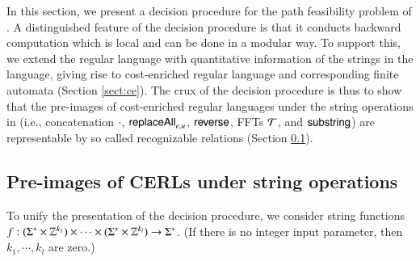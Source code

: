 

%

In this section, we present a decision procedure for the path feasibility problem of {\slint}. A distinguished feature of the decision procedure is that it conducts backward computation which is local and can be done in a modular way. To support this, we extend the regular language with quantitative information of the strings in the language, giving rise to cost-enriched regular language and corresponding finite automata (Section \ref{sect:ce}). The crux of the decision procedure is thus to %
show that the %
pre-images of cost-enriched regular languages under the string operations in {\slint} (i.e., concatenation $\cdot$, $\mathsf{replaceAll}_{e,u}$, $\mathsf{reverse}$, FFTs $\mathcal{T}$, and $\mathsf{substring}$) are representable by so called recognizable relations (Section \ref{sect:pre}). 




\subsection{Pre-images of CERLs under string operations} \label{sect:pre}

To unify the presentation of the decision procedure, %
we consider string functions $f: (\Sigma^* \times \mathbb{Z}^{k_1}) \times \cdots \times (\Sigma^* \times \mathbb{Z}^{k_l}) \rightarrow \Sigma^*$. (If there is no integer input parameter, then $k_1,\cdots,k_l$ are zero.)  

